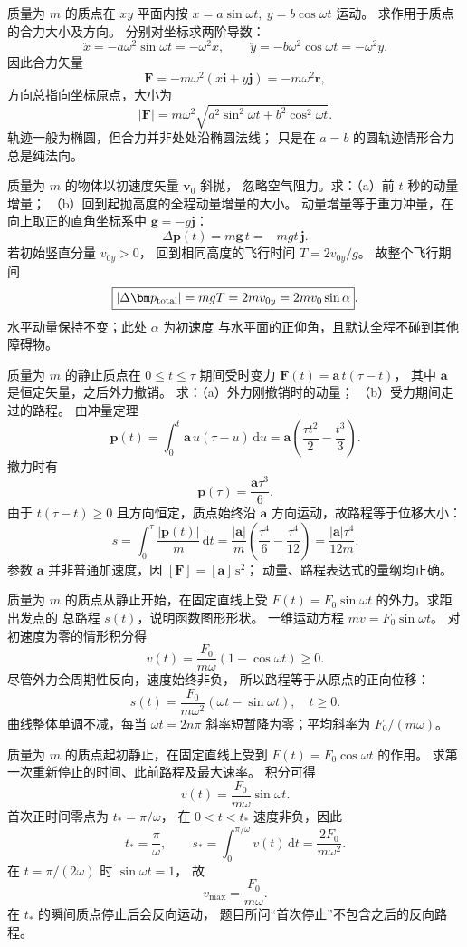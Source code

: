 质量为 $m$ 的质点在 $xy$ 平面内按
$x=a\sin\omega t,\ y=b\cos\omega t$ 运动。
求作用于质点的合力大小及方向。
\exsolution
分别对坐标求两阶导数：
\[
\ddot x=-a\omega^2\sin\omega t=-\omega^2x,\qquad
\ddot y=-b\omega^2\cos\omega t=-\omega^2y.
\]
因此合力矢量
\[
\boxed{\bm F=-m\omega^2(x\bm i+y\bm j)
=-m\omega^2\bm r},
\]
方向总指向坐标原点，大小为
\[
\boxed{|\bm F|=m\omega^2
\sqrt{a^2\sin^2\omega t+b^2\cos^2\omega t}}.
\]
\excheck 轨迹一般为椭圆，但合力并非处处沿椭圆法线；
只是在 $a=b$ 的圆轨迹情形合力总是纯法向。

质量为 $m$ 的物体以初速度矢量 $\bm v_0$ 斜抛，
忽略空气阻力。求：（a）前 $t$ 秒的动量增量；
（b）回到起抛高度的全程动量增量的大小。
\exsolution
动量增量等于重力冲量，在向上取正的直角坐标系中
$\bm g=-g\bm j$：
\[
\boxed{\Delta\bm p(t)=m\bm g\,t=-mgt\,\bm j}.
\]
若初始竖直分量 $v_{0y}>0$，
回到相同高度的飞行时间 $T=2v_{0y}/g$。
故整个飞行期间
\[
\boxed{|\Delta\bm p_{\rm total}|=mgT
=2m v_{0y}=2m v_0\sin\alpha}.
\]
\excheck 水平动量保持不变；此处 $\alpha$ 为初速度
与水平面的正仰角，且默认全程不碰到其他障碍物。

质量为 $m$ 的静止质点在 $0\le t\le\tau$ 期间受时变力
$\bm F(t)=\bm a\,t(\tau-t)$，
其中 $\bm a$ 是恒定矢量，之后外力撤销。
求：（a）外力刚撤销时的动量；
（b）受力期间走过的路程。
\exsolution
由冲量定理
\[
\bm p(t)=\int_0^t\bm a\,u(\tau-u)\,\mathrm du
=\bm a\left(\frac{\tau t^2}{2}-\frac{t^3}{3}\right).
\]
撤力时有
\[
\boxed{\bm p(\tau)=\frac{\bm a\tau^3}{6}}.
\]
由于 $t(\tau-t)\ge0$ 且方向恒定，质点始终沿 $\bm a$
方向运动，故路程等于位移大小：
\[
s=\int_0^\tau\frac{|\bm p(t)|}{m}\,\mathrm dt
=\frac{|\bm a|}{m}\left(\frac{\tau^4}{6}
-\frac{\tau^4}{12}\right)
=\boxed{\frac{|\bm a|\tau^4}{12m}}.
\]
\excheck 参数 $\bm a$ 并非普通加速度，因
$[\bm F]=[\bm a]\,\mathrm s^2$；
动量、路程表达式的量纲均正确。

质量为 $m$ 的质点从静止开始，在固定直线上受
$F(t)=F_0\sin\omega t$ 的外力。求距出发点的
总路程 $s(t)$，说明函数图形形状。
\exsolution
一维运动方程 $m\dot v=F_0\sin\omega t$。
对初速度为零的情形积分得
\[
v(t)=\frac{F_0}{m\omega}(1-\cos\omega t)\ge0.
\]
尽管外力会周期性反向，速度始终非负，
所以路程等于从原点的正向位移：
\[
\boxed{s(t)=\frac{F_0}{m\omega^2}
(\omega t-\sin\omega t)},\quad t\ge0.
\]
\excheck 曲线整体单调不减，每当 $\omega t=2n\pi$
斜率短暂降为零；平均斜率为 $F_0/(m\omega)$。

质量为 $m$ 的质点起初静止，在固定直线上受到
$F(t)=F_0\cos\omega t$ 的作用。
求第一次重新停止的时间、此前路程及最大速率。
\exsolution
积分可得
\[
v(t)=\frac{F_0}{m\omega}\sin\omega t.
\]
首次正时间零点为 $t_*=\pi/\omega$，
在 $0<t<t_*$ 速度非负，因此
\[
\boxed{t_*=\frac\pi\omega,\qquad
s_*=\int_0^{\pi/\omega}v(t)\,\mathrm dt
=\frac{2F_0}{m\omega^2}}.
\]
在 $t=\pi/(2\omega)$ 时 $\sin\omega t=1$，
故
\[
\boxed{v_{\max}=\frac{F_0}{m\omega}}.
\]
\excheck 在 $t_*$ 的瞬间质点停止后会反向运动，
题目所问“首次停止”不包含之后的反向路程。

